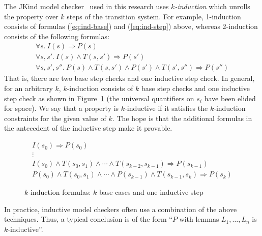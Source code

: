 The JKind model checker~\cite{2017arXiv171201222G} used in this research uses {\em
  $k$-induction} which unrolls the property over $k$ steps of the
transition system. For example, 1-induction consists of formulas
(\ref{eq:ind-base}) and (\ref{eq:ind-step}) above, whereas
2-induction consists of the following formulas:
\begin{gather*}
\forall s.~ I(s) \Rightarrow P(s) \\
\forall s, s'.~ I(s) \land T(s, s') \Rightarrow P(s') \\
\forall s, s', s''.~ P(s) \land T(s, s') \land P(s') \land T(s',
  s'') \Rightarrow P(s'')
\end{gather*}
That is, there are two base step checks and one inductive step check.
In general, for an arbitrary $k$, $k$-induction consists of $k$
base step checks and one inductive step check as shown in
Figure~\ref{eq:k-induction} (the universal quantifiers on $s_i$ have
been elided for space). We say that a property is $k$-inductive if it
satisfies the $k$-induction constraints for the given value of $k$.
The hope is that the additional formulas in the antecedent of the
inductive step make it provable.

\begin{figure}[h!]
\begin{gather*}
I(s_0) \Rightarrow P(s_0) \\[-2pt]
%
\vdots \\[2pt]
%
I(s_0) \land T(s_0, s_1) \land \cdots \land T(s_{k-2}, s_{k-1})
\Rightarrow P(s_{k-1}) \\[2pt]
%
P(s_0) \land T(s_0, s_1) \land \cdots \land P(s_{k-1}) \land
T(s_{k-1}, s_k) \Rightarrow P(s_k)
\end{gather*}
\caption{$k$-induction formulas: $k$ base cases and one inductive
  step}
\label{eq:k-induction}
\end{figure}

In practice, inductive model checkers often use a combination of the
above techniques. Thus, a typical conclusion is of the form ``$P$ with
lemmas $L_1, \ldots, L_n$ is $k$-inductive''.


